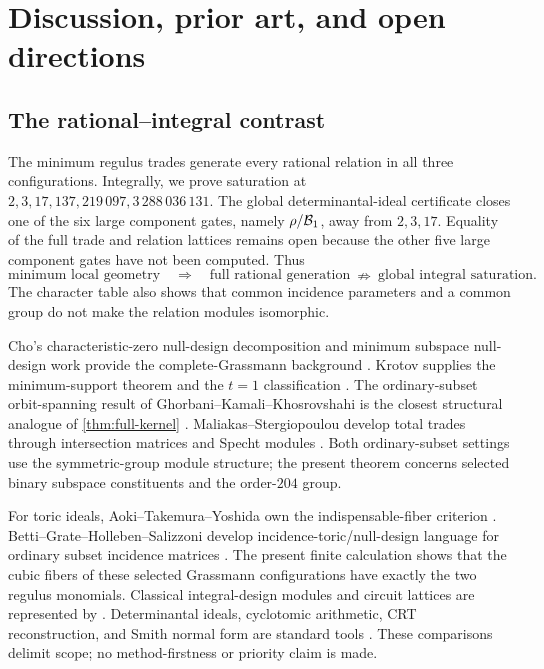 \section{Discussion, prior art, and open directions}
\label{sec:discussion}

\subsection{The rational--integral contrast}

The minimum regulus trades generate every rational relation in all three
configurations.  Integrally, we prove saturation at
\(2,3,17,137,219\,097,3\,288\,036\,131\).  The global
determinantal-ideal certificate closes one of the six large component
gates, namely \(\rho/\mathcal B_1\), away from \(2,3,17\).  Equality of the full
trade and relation lattices remains open because the other five large
component gates have not been computed.  Thus
\[
\text{minimum local geometry}
\quad\Longrightarrow\quad
\text{full rational generation}
\ \nRightarrow\
\text{global integral saturation}.
\]
The character table also shows that common incidence parameters and a
common group do not make the relation modules isomorphic.

Cho's characteristic-zero null-design decomposition and minimum subspace
null-design work provide the complete-Grassmann background
\cite{Cho1997,Cho1998}.  Krotov supplies the minimum-support theorem and
the \(t=1\) classification \cite{Krotov2017}.  The ordinary-subset
orbit-spanning result of Ghorbani--Kamali--Khosrovshahi is the closest
structural analogue of \cref{thm:full-kernel}
\cite{GhorbaniKamaliKhosrovshahi}.  Maliakas--Stergiopoulou develop total
trades through intersection matrices and Specht modules
\cite{MaliakasStergiopoulou}.  Both ordinary-subset settings use the
symmetric-group module structure; the present theorem concerns selected
binary subspace constituents and the order-\(204\) group.

For toric ideals, Aoki--Takemura--Yoshida own the indispensable-fiber
criterion \cite{AokiTakemuraYoshida}.  Betti--Grate--Holleben--Salizzoni
develop incidence-toric/null-design language for ordinary subset
incidence matrices \cite{BettiEtAl2026}.  The present finite calculation
shows that the cubic fibers of these selected Grassmann configurations
have exactly the two regulus monomials.  Classical integral-design
modules and circuit lattices are represented by
\cite{GraverJurkat,GrahamLiLi}.  Determinantal ideals, cyclotomic
arithmetic, CRT reconstruction, and Smith normal form are standard tools
\cite{StacksProjectFitting,Cohen1993,Washington1997,Newman1972}.  These
comparisons delimit scope; no method-firstness or priority claim is made.

